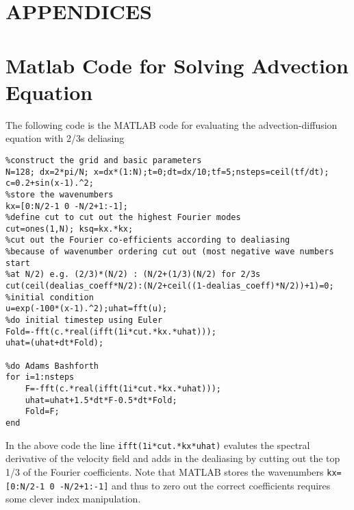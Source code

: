 \documentclass[letterpaper,12pt,titlepage,oneside,final]{book}
\begin{document}
%
%



\appendix

\chapter*{APPENDICES}
\chapter[Spectral Example in Matlab]{Matlab Code for Solving Advection Equation}
\label{AppendixA}

The following code is the MATLAB code for evaluating the advection-diffusion equation with 2/3s deliasing
\begin{verbatim}
%construct the grid and basic parameters
N=128; dx=2*pi/N; x=dx*(1:N);t=0;dt=dx/10;tf=5;nsteps=ceil(tf/dt);
c=0.2+sin(x-1).^2;
%store the wavenumbers
kx=[0:N/2-1 0 -N/2+1:-1];
%define cut to cut out the highest Fourier modes
cut=ones(1,N); ksq=kx.*kx;
%cut out the Fourier co-efficients according to dealiasing 
%because of wavenumber ordering cut out (most negative wave numbers start
%at N/2) e.g. (2/3)*(N/2) : (N/2+(1/3)(N/2) for 2/3s
cut(ceil(dealias_coeff*N/2):(N/2+ceil((1-dealias_coeff)*N/2))+1)=0;
%initial condition
u=exp(-100*(x-1).^2);uhat=fft(u);
%do initial timestep using Euler
Fold=-fft(c.*real(ifft(1i*cut.*kx.*uhat)));
uhat=(uhat+dt*Fold); 

%do Adams Bashforth
for i=1:nsteps
    F=-fft(c.*real(ifft(1i*cut.*kx.*uhat)));
    uhat=uhat+1.5*dt*F-0.5*dt*Fold;
    Fold=F;
end
\end{verbatim}
In the above code the line \texttt{ifft(1i*cut.*kx*uhat)} evalutes the spectral derivative of the velocity field and adds in the dealiasing by cutting out the top 1/3 of the Fourier coefficients. Note that MATLAB stores the wavenumbers \texttt{kx=[0:N/2-1 0 -N/2+1:-1]} and thus to zero out the correct coefficients requires some clever index manipulation. 
\end{document}
